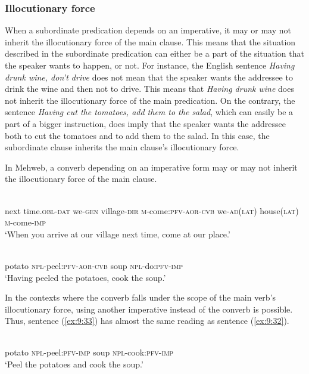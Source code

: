 ﻿\documentclass[output=paper]{langsci/langscibook}
\begin{document}
\subsubsection{Illocutionary force}


When a subordinate predication depends on an imperative, it may or may not
inherit the illocutionary force of the main clause. This means that the
situation described in the subordinate predication can either be a part of the
situation that the speaker wants to happen, or not. For instance,
the English sentence \emph{Having drunk wine, don't drive} does not
mean that the speaker wants the addressee to drink the wine and then not
to drive. This means that \emph{Having drunk wine} does not
inherit the illocutionary force of the main predication. On the
contrary, the sentence \emph{Having cut the tomatoes, add them to the
salad}, which can easily be a part of a bigger instruction, does imply
that the speaker wants the addressee both to cut the tomatoes and to add
them to the salad. In this case, the subordinate clause inherits the
main clause's illocutionary force.

In Mehweb, a converb depending on an imperative form may or may not
inherit the illocutionary force of the main clause.

\ea %
\\
next time.\textsc{obl}-\textsc{dat} we-\textsc{gen} village-\textsc{dir} \textsc{m}-come:\textsc{pfv}-\textsc{aor}-\textsc{cvb} we-\textsc{ad(lat)} house(\textsc{lat}) \textsc{m}-come-\textsc{imp}\\
\glt `When you arrive at our village next time, come at our place.'

\ex \label{ex:9:32} %
\\
potato \textsc{npl}-peel:\textsc{pfv}-\textsc{aor}-\textsc{cvb} soup \textsc{npl}-do:\textsc{pfv}-\textsc{imp}\\
\glt `Having peeled the potatoes, cook the soup.'
\z

In the contexts where the converb falls under the scope of the main
verb's illocutionary force, using another imperative instead of the
converb is possible. Thus, sentence (\ref{ex:9:33}) has almost the same reading as
sentence (\ref{ex:9:32}).

\ea \label{ex:9:33} %
\\
potato \textsc{npl}-peel:\textsc{pfv}-\textsc{imp} soup \textsc{npl}-cook:\textsc{pfv}-\textsc{imp}\\
\glt `Peel the potatoes and cook the soup.'
\z
\end{document}
